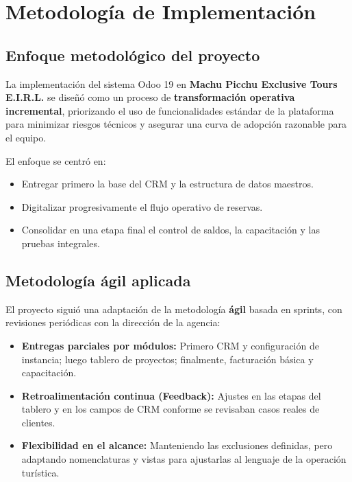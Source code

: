 \section{Metodología de Implementación}

\subsection{Enfoque metodológico del proyecto}

La implementación del sistema Odoo 19 en \textbf{Machu Picchu Exclusive Tours E.I.R.L.} se diseñó como un proceso de \textbf{transformación operativa incremental}, priorizando el uso de funcionalidades estándar de la plataforma para minimizar riesgos técnicos y asegurar una curva de adopción razonable para el equipo.

El enfoque se centró en:

\begin{itemize}
    \item Entregar primero la base del CRM y la estructura de datos maestros.
    \item Digitalizar progresivamente el flujo operativo de reservas.
    \item Consolidar en una etapa final el control de saldos, la capacitación y las pruebas integrales.
\end{itemize}

\subsection{Metodología ágil aplicada}

El proyecto siguió una adaptación de la metodología \textbf{ágil} basada en sprints, con revisiones periódicas con la dirección de la agencia:

\begin{itemize}
    \item \textbf{Entregas parciales por módulos:} Primero CRM y configuración de instancia; luego tablero de proyectos; finalmente, facturación básica y capacitación.
    \item \textbf{Retroalimentación continua (Feedback):} Ajustes en las etapas del tablero y en los campos de CRM conforme se revisaban casos reales de clientes.
    \item \textbf{Flexibilidad en el alcance:} Manteniendo las exclusiones definidas, pero adaptando nomenclaturas y vistas para ajustarlas al lenguaje de la operación turística.
\end{itemize}

